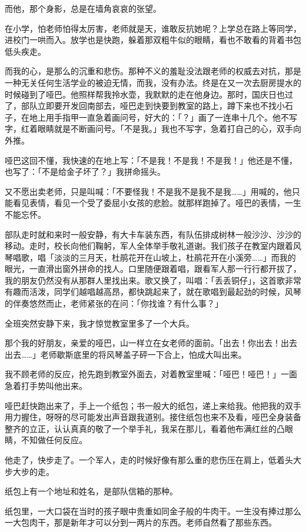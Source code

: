 \documentclass[UTF8]{ctexart}
\begin{document}
而他，那个身影，总是在墙角哀哀的张望。

在小学，怕老师怕得太厉害，老师就是天，谁敢反抗她呢？上学总在路上等同学，进校门一哄而入。放学也是快跑，躲着那双粗牛似的眼睛，看也不敢看的背着书包低头疾走。

而我的心，是那么的沉重和悲伤。那种不义的羞耻没法跟老师的权威去对抗，那是一种无关任何生活学业的被迫无情，而我，没有办法。终是在又一次去厨房提水的时候碰到了哑巴。他照样帮我拎水壶，我默默的走在他身边。那时，国庆日也过了，部队立即要开发回南部去，哑巴走到快要到教室的路上，蹲下来也不找小石子，在地上用手指甲一直急着画问号，好大的：「？」画了一连串十几个。他不写字，红着眼睛就是不断画问号。「不是我。」我也不写字，急着打自己的心，双手向外推。

哑巴这回不懂，我快速的在地上写：「不是我！不是我！不是我！」他还是不懂，也写了：「不是给金子坏了？」我拼命摇头。

又不愿出卖老师，只是叫喊：「不要怪我！不是我不是我不是我……」用喊的，他只能看见表情，看见一个受了委屈小女孩的悲脸。就那样跑掉了。哑巴的表情，一生不能忘怀。

部队走时就和来时一般安静，有大卡车装东西，有队伍排成树林一般沙沙、沙沙的移动。走时，校长向他们鞠躬，军人全体举手敬礼道谢。我们孩子在教室内跟着风琴唱歌，唱「淡淡的三月天，杜鹃花开在山坡上，杜鹃花开在小溪旁……」而我的眼光，一直滑出窗外拼命的找人。口里随便跟着唱，跟看军人那一行行都开拔了，我的朋友仍然没有从那群人里找出来。歌又换了，叫唱：「丢丢铜仔」，这首歌非常有趣而活泼，同学们越唱越高昂，都快跳起来了，就在歌唱到最起劲的时候，风琴的伴奏悠然而止，老师紧张的在问：「你找谁？有什么事？」

全班突然安静下来，我才惊觉教室里多了一个大兵。

那个我的好朋友，亲爱的哑巴，山一样立在女老师的面前。「出去！你出去！出去出去……」老师歇斯底里的将风琴盖子砰一下合上，怕成大叫出来。

我不顾老师的反应，抢先跑到教室外面去，对着教室里喊：「哑巴！哑巴！」一面急着打手势叫他出来。

哑巴赶快跑出来了，手上一个纸包；书一般大的纸包，递上来给我。他把我的双手用力握住，呀呀的尽可能发出声音跟我道别。接住纸包也来不及看，哑巴全身装备整齐的立正，认认真真的敬了一个举手礼，我呆在那儿，看着他布满红丝的凸眼睛，不知做任何反应。

他走了，快步走了。一个军人，走的时候好像有那么重的悲伤压在肩上，低着头大步大步的走。

纸包上有一个地址和姓名，是部队信箱的那种。

纸包里，一大口袋在当时的孩子眼中贵重如同金子般的牛肉干。一生没有捧过那么一大包肉干，那是新年才可以分到一两片的东西。老师自然看了那些东西。
\end{document}
